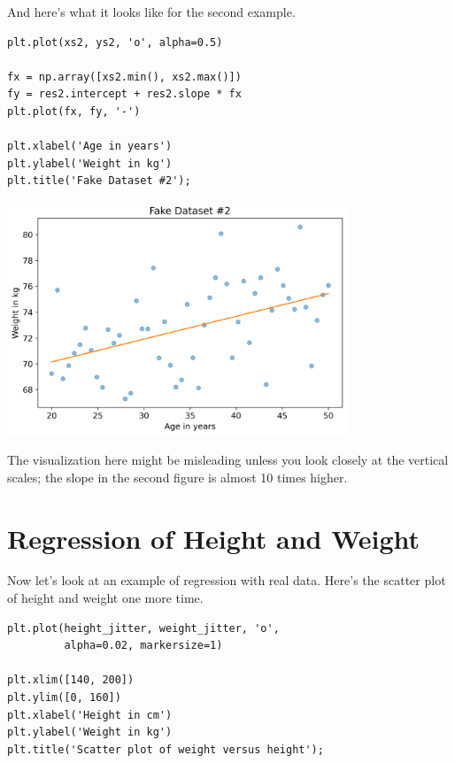 And here's what it looks like for the second example.

\begin{lstlisting}[]
plt.plot(xs2, ys2, 'o', alpha=0.5)

fx = np.array([xs2.min(), xs2.max()])
fy = res2.intercept + res2.slope * fx
plt.plot(fx, fy, '-')

plt.xlabel('Age in years')
plt.ylabel('Weight in kg')
plt.title('Fake Dataset #2');
\end{lstlisting}

\begin{center}
\includegraphics[width=4in]{chapters/09_relationships_files/09_relationships_89_0.png}
\end{center}

The visualization here might be misleading unless you look closely at
the vertical scales; the slope in the second figure is almost 10 times
higher.

\hypertarget{regression-of-height-and-weight}{%
\section{Regression of Height and
Weight}\label{regression-of-height-and-weight}}

Now let's look at an example of regression with real data. Here's the
scatter plot of height and weight one more time.

\begin{lstlisting}[]
plt.plot(height_jitter, weight_jitter, 'o', 
         alpha=0.02, markersize=1)

plt.xlim([140, 200])
plt.ylim([0, 160])
plt.xlabel('Height in cm')
plt.ylabel('Weight in kg')
plt.title('Scatter plot of weight versus height');
\end{lstlisting}

